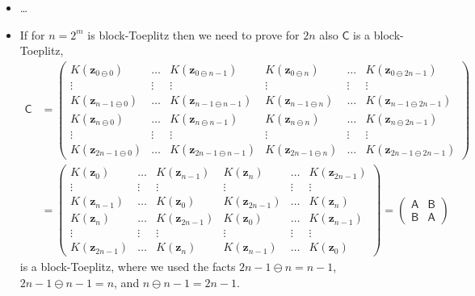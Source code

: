 \documentclass{iitthesis}          %
\newcommand{\bm}[1]{\boldsymbol{#1}}
\newcommand{\mB}{\mathsf{B}}
\newcommand{\vz}{\bm{z}}
\newcommand{\mA}{\mathsf{A}}
\newcommand{\mC}{\mathsf{C}}
\begin{document}
\begin{itemize}
	\item \ldots
	\item If for $n=2^m$ is block-Toeplitz then we need to prove for $2n$ also $\mC$ is a block-Toeplitz,
\begin{align*}
\mC &= 
\begin{pmatrix}
K(\vz_{0    \ominus 0}) & \hdots & K(\vz_{0    \ominus n-1}) & K(\vz_{0    \ominus n}) & \hdots & K(\vz_{0    \ominus 2n-1}) \\
\vdots             & \vdots &             \vdots          &           \vdots      & \vdots &             \vdots         \\
K(\vz_{n-1  \ominus 0}) & \hdots & K(\vz_{n-1  \ominus n-1}) & K(\vz_{n-1  \ominus n}) & \hdots & K(\vz_{n-1  \ominus 2n-1}) \\
K(\vz_{n    \ominus 0}) & \hdots & K(\vz_{n    \ominus n-1}) & K(\vz_{n    \ominus n}) & \hdots & K(\vz_{n    \ominus 2n-1}) \\
\vdots      & \vdots &             \vdots        &             \vdots      & \vdots &             \vdots         \\
K(\vz_{2n-1 \ominus 0}) & \hdots & K(\vz_{2n-1 \ominus n-1}) & K(\vz_{2n-1 \ominus n}) & \hdots & K(\vz_{2n-1 \ominus 2n-1}) 
\end{pmatrix} 
\\
& = 
\begin{pmatrix}
K(\vz_{  0   }) & \hdots & K(\vz_{ n-1}) & K(\vz_{ n}) & \hdots & K(\vz_{ 2n-1}) \\
\vdots          & \vdots &             \vdots          &           \vdots      & \vdots &             \vdots         \\
K(\vz_{ n-1  }) & \hdots & K(\vz_{ 0 }) & K(\vz_{ 2n-1 }) & \hdots & K(\vz_{ n }) \\
K(\vz_{ n    }) & \hdots & K(\vz_{ 2n-1 }) & K(\vz_{ 0 }) & \hdots & K(\vz_{n-1}) \\
\vdots          & \vdots &             \vdots        &             \vdots      & \vdots &             \vdots         \\
K(\vz_{ 2n-1 }) & \hdots & K(\vz_{ n }) & K(\vz_{ n-1 }) & \hdots & K(\vz_{ 0 }) 
\end{pmatrix} 
=
\begin{pmatrix}
\mA & \mB \\ \mB & \mA
\end{pmatrix}
\end{align*}
is a block-Toeplitz, where we used the facts $2n-1 \ominus n = n-1$, $2n-1 \ominus n-1 = n$, and $n \ominus n-1 = 2n-1$.
\end{itemize}
\end{document}
